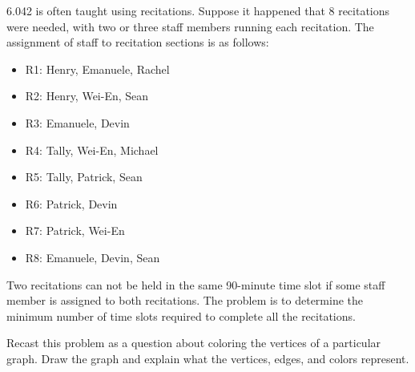 \documentclass[12pt,twoside]{article}
\newcommand{\TAonename}{Henry}
\newcommand{\TAtwoname}{Emanuele}
\newcommand{\TAthreename}{Rachel}
\newcommand{\TAfourname}{Patrick}
\newcommand{\TAfivename}{Devin}
\newcommand{\TAsixname}{Tally}
\newcommand{\TAsevenname}{Michael}
\newcommand{\TAeightname}{Wei-En}
\newcommand{\TAninename}{Sean}
\begin{document}
\begin{problem}{20}
6.042 is often taught using recitations.  Suppose it
happened that 8 recitations were needed, with two or three staff members
running each recitation.  The assignment of staff to recitation sections
is as follows:

\begin{itemize}
\item R1:  \TAonename, \TAtwoname, \TAthreename 
\item R2:  \TAonename, \TAeightname, \TAninename
\item R3:  \TAtwoname, \TAfivename
\item R4:  \TAsixname, \TAeightname, \TAsevenname
\item R5:  \TAsixname, \TAfourname, \TAninename
\item R6:  \TAfourname, \TAfivename
\item R7:  \TAfourname, \TAeightname
\item R8:  \TAtwoname, \TAfivename, \TAninename 
\end{itemize}

Two recitations can not be held in the same 90-minute time slot if some
staff member is assigned to both recitations.  The problem is to determine
the minimum number of time slots required to complete all the recitations.

\bparts

 Recast this problem as a question about coloring the
vertices of a particular graph.  Draw the graph and explain what the
vertices, edges, and colors represent.



\end{problem}
\end{document}
